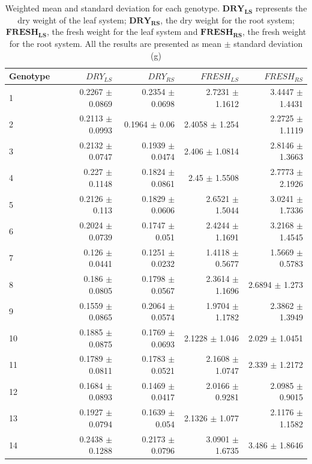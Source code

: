\begin{table}[ht]
\centering
\caption[Weighted mean and standard deviation for each genotype]{Weighted mean and standard deviation for each genotype. $\mathbf{DRY_{LS}}$ represents the dry weight of the leaf system; $\mathbf{DRY_{RS}}$, the dry weight for the root system; $\mathbf{FRESH_{LS}}$, the fresh weight for the leaf system and $\mathbf{FRESH_{RS}}$, the fresh weight for the root system. All the results are presented as mean $\pm$ standard deviation (g)}
\begin{tabular}{lrrrr}
  \toprule
Genotype & $DRY_{LS}$ & $DRY_{RS}$ & $FRESH_{LS}$ & $FRESH_{RS}$ \\ 
  \midrule
1 & 0.2267 $\pm$ 0.0869 & 0.2354 $\pm$ 0.0698 & 2.7231 $\pm$ 1.1612 & 3.4447 $\pm$ 1.4431 \\ 
  2 & 0.2113 $\pm$ 0.0993 & 0.1964 $\pm$ 0.06 & 2.4058 $\pm$ 1.254 & 2.2725 $\pm$ 1.1119 \\ 
  3 & 0.2132 $\pm$ 0.0747 & 0.1939 $\pm$ 0.0474 & 2.406 $\pm$ 1.0814 & 2.8146 $\pm$ 1.3663 \\ 
  4 & 0.227 $\pm$ 0.1148 & 0.1824 $\pm$ 0.0861 & 2.45 $\pm$ 1.5508 & 2.7773 $\pm$ 2.1926 \\ 
  5 & 0.2126 $\pm$ 0.113 & 0.1829 $\pm$ 0.0606 & 2.6521 $\pm$ 1.5044 & 3.0241 $\pm$ 1.7336 \\ 
  6 & 0.2024 $\pm$ 0.0739 & 0.1747 $\pm$ 0.051 & 2.4244 $\pm$ 1.1691 & 3.2168 $\pm$ 1.4545 \\ 
  7 & 0.126 $\pm$ 0.0441 & 0.1251 $\pm$ 0.0232 & 1.4118 $\pm$ 0.5677 & 1.5669 $\pm$ 0.5783 \\ 
  8 & 0.186 $\pm$ 0.0805 & 0.1798 $\pm$ 0.0567 & 2.3614 $\pm$ 1.1696 & 2.6894 $\pm$ 1.273 \\ 
  9 & 0.1559 $\pm$ 0.0865 & 0.2064 $\pm$ 0.0574 & 1.9704 $\pm$ 1.1782 & 2.3862 $\pm$ 1.3949 \\ 
  10 & 0.1885 $\pm$ 0.0875 & 0.1769 $\pm$ 0.0693 & 2.1228 $\pm$ 1.046 & 2.029 $\pm$ 1.0451 \\ 
  11 & 0.1789 $\pm$ 0.0811 & 0.1783 $\pm$ 0.0521 & 2.1608 $\pm$ 1.0747 & 2.339 $\pm$ 1.2172 \\ 
  12 & 0.1684 $\pm$ 0.0893 & 0.1469 $\pm$ 0.0417 & 2.0166 $\pm$ 0.9281 & 2.0985 $\pm$ 0.9015 \\ 
  13 & 0.1927 $\pm$ 0.0794 & 0.1639 $\pm$ 0.054 & 2.1326 $\pm$ 1.077 & 2.1176 $\pm$ 1.1582 \\ 
  14 & 0.2438 $\pm$ 0.1288 & 0.2173 $\pm$ 0.0796 & 3.0901 $\pm$ 1.6735 & 3.486 $\pm$ 1.8646 \\ 

\end{tabular}
\end{table}
